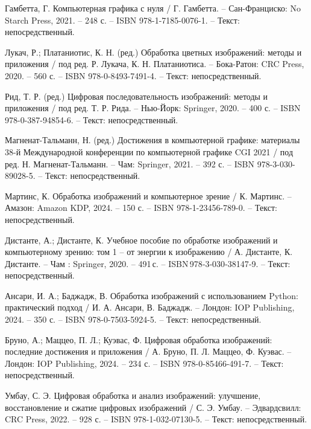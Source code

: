 
\begin{thebibliography}{9}

    Гамбетта, Г. Компьютерная графика с нуля / Г. Гамбетта. – Сан-Франциско: No Starch Press, 2021. – 248 с. – ISBN 978-1-7185-0076-1. – Текст: непосредственный.
    
    Лукач, Р.; Платаниотис, К. Н. (ред.) Обработка цветных изображений: методы и приложения / под ред. Р. Лукача, К. Н. Платаниотиса. – Бока-Ратон: CRC Press, 2020. – 560 с. – ISBN 978-0-8493-7491-4. – Текст: непосредственный.
    
    Рид, Т. Р. (ред.) Цифровая последовательность изображений: методы и приложения / под ред. Т. Р. Рида. – Нью-Йорк: Springer, 2020. – 400 с. – ISBN 978-0-387-94854-6. – Текст: непосредственный.
    
    Магненат-Тальманн, Н. (ред.) Достижения в компьютерной графике: материалы 38-й Международной конференции по компьютерной графике CGI 2021 / под ред. Н. Магненат-Тальманн. – Чам: Springer, 2021. – 392 с. – ISBN 978-3-030-89028-5. – Текст: непосредственный.
    
    Мартинс, К. Обработка изображений и компьютерное зрение / К. Мартинс. – Амазон: Amazon KDP, 2024. – 150 с. – ISBN 978-1-23456-789-0. – Текст: непосредственный.
    
    Дистанте, А.; Дистанте, К. Учебное пособие по обработке изображений и компьютерному зрению: том 1 – от энергии к изображению / А. Дистанте, К. Дистанте. – Чам : Springer, 2020. – 491 с. – ISBN 978‑3‑030‑38147‑9. – Текст: непосредственный.
    
    Ансари, И. А.; Баджадж, В. Обработка изображений с использованием Python: практический подход / И. А. Ансари, В. Баджадж. – Лондон: IOP Publishing, 2024. – 350 с. – ISBN 978-0-7503-5924-5. – Текст: непосредственный.
    
    Бруно, А.; Маццео, П. Л.; Куэвас, Ф. Цифровая обработка изображений: последние достижения и приложения / А. Бруно, П. Л. Маццео, Ф. Куэвас. – Лондон: IOP Publishing, 2024. – 234 с. – ISBN 978-0-85466-491-7. – Текст: непосредственный.
    
    Умбау, С. Э. Цифровая обработка и анализ изображений: улучшение, восстановление и сжатие цифровых изображений / С. Э. Умбау. – Эдвардсвилл: CRC Press, 2022. – 928 с. – ISBN 978-1-032-07130-5. – Текст: непосредственный.
    

\end{thebibliography}
